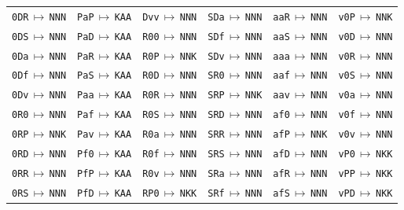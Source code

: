 {\begin{longtable}{@{}llllll@{}}
\texttt{0DR}\,$\mapsto$\,\texttt{NNN} & \texttt{PaP}\,$\mapsto$\,\texttt{KAA} & \texttt{Dvv}\,$\mapsto$\,\texttt{NNN} & \texttt{SDa}\,$\mapsto$\,\texttt{NNN} & \texttt{aaR}\,$\mapsto$\,\texttt{NNN} & \texttt{v0P}\,$\mapsto$\,\texttt{NNK} \\
\texttt{0DS}\,$\mapsto$\,\texttt{NNN} & \texttt{PaD}\,$\mapsto$\,\texttt{KAA} & \texttt{R00}\,$\mapsto$\,\texttt{NNN} & \texttt{SDf}\,$\mapsto$\,\texttt{NNN} & \texttt{aaS}\,$\mapsto$\,\texttt{NNN} & \texttt{v0D}\,$\mapsto$\,\texttt{NNN} \\
\texttt{0Da}\,$\mapsto$\,\texttt{NNN} & \texttt{PaR}\,$\mapsto$\,\texttt{KAA} & \texttt{R0P}\,$\mapsto$\,\texttt{NNK} & \texttt{SDv}\,$\mapsto$\,\texttt{NNN} & \texttt{aaa}\,$\mapsto$\,\texttt{NNN} & \texttt{v0R}\,$\mapsto$\,\texttt{NNN} \\
\texttt{0Df}\,$\mapsto$\,\texttt{NNN} & \texttt{PaS}\,$\mapsto$\,\texttt{KAA} & \texttt{R0D}\,$\mapsto$\,\texttt{NNN} & \texttt{SR0}\,$\mapsto$\,\texttt{NNN} & \texttt{aaf}\,$\mapsto$\,\texttt{NNN} & \texttt{v0S}\,$\mapsto$\,\texttt{NNN} \\
\texttt{0Dv}\,$\mapsto$\,\texttt{NNN} & \texttt{Paa}\,$\mapsto$\,\texttt{KAA} & \texttt{R0R}\,$\mapsto$\,\texttt{NNN} & \texttt{SRP}\,$\mapsto$\,\texttt{NNK} & \texttt{aav}\,$\mapsto$\,\texttt{NNN} & \texttt{v0a}\,$\mapsto$\,\texttt{NNN} \\
\texttt{0R0}\,$\mapsto$\,\texttt{NNN} & \texttt{Paf}\,$\mapsto$\,\texttt{KAA} & \texttt{R0S}\,$\mapsto$\,\texttt{NNN} & \texttt{SRD}\,$\mapsto$\,\texttt{NNN} & \texttt{af0}\,$\mapsto$\,\texttt{NNN} & \texttt{v0f}\,$\mapsto$\,\texttt{NNN} \\
\texttt{0RP}\,$\mapsto$\,\texttt{NNK} & \texttt{Pav}\,$\mapsto$\,\texttt{KAA} & \texttt{R0a}\,$\mapsto$\,\texttt{NNN} & \texttt{SRR}\,$\mapsto$\,\texttt{NNN} & \texttt{afP}\,$\mapsto$\,\texttt{NNK} & \texttt{v0v}\,$\mapsto$\,\texttt{NNN} \\
\texttt{0RD}\,$\mapsto$\,\texttt{NNN} & \texttt{Pf0}\,$\mapsto$\,\texttt{KAA} & \texttt{R0f}\,$\mapsto$\,\texttt{NNN} & \texttt{SRS}\,$\mapsto$\,\texttt{NNN} & \texttt{afD}\,$\mapsto$\,\texttt{NNN} & \texttt{vP0}\,$\mapsto$\,\texttt{NKK} \\
\texttt{0RR}\,$\mapsto$\,\texttt{NNN} & \texttt{PfP}\,$\mapsto$\,\texttt{KAA} & \texttt{R0v}\,$\mapsto$\,\texttt{NNN} & \texttt{SRa}\,$\mapsto$\,\texttt{NNN} & \texttt{afR}\,$\mapsto$\,\texttt{NNN} & \texttt{vPP}\,$\mapsto$\,\texttt{NKK} \\
\texttt{0RS}\,$\mapsto$\,\texttt{NNN} & \texttt{PfD}\,$\mapsto$\,\texttt{KAA} & \texttt{RP0}\,$\mapsto$\,\texttt{NKK} & \texttt{SRf}\,$\mapsto$\,\texttt{NNN} & \texttt{afS}\,$\mapsto$\,\texttt{NNN} & \texttt{vPD}\,$\mapsto$\,\texttt{NKK} \\

\end{longtable}}
